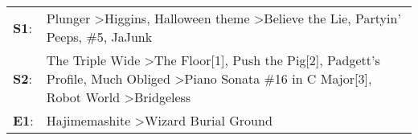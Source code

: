 \begin{supertabular}{p{0.03\textwidth}p{0.92\textwidth}}
 \textbf{S1}:  &                                                                                                   Plunger\textsuperscript{} \textgreater \enspace Higgins\textsuperscript{}, \enspace Halloween theme\textsuperscript{} \textgreater \enspace Believe the Lie\textsuperscript{}, \enspace Partyin' Peeps\textsuperscript{}, \enspace \#5\textsuperscript{}, \enspace JaJunk\textsuperscript{}  \enspace  \\
 \textbf{S2}:  &  The Triple Wide\textsuperscript{} \textgreater \enspace The Floor[1]\textsuperscript{}, \enspace Push the Pig[2]\textsuperscript{}, \enspace Padgett's Profile\textsuperscript{}, \enspace Much Obliged\textsuperscript{} \textgreater \enspace Piano Sonata \#16 in C Major[3]\textsuperscript{}, \enspace Robot World\textsuperscript{} \textgreater \enspace Bridgeless\textsuperscript{}  \enspace  \\
 \textbf{E1}:  &                                                                                                                                                                                                                                                                                                  Hajimemashite\textsuperscript{} \textgreater \enspace Wizard Burial Ground\textsuperscript{}  \enspace  \\
\end{supertabular}
